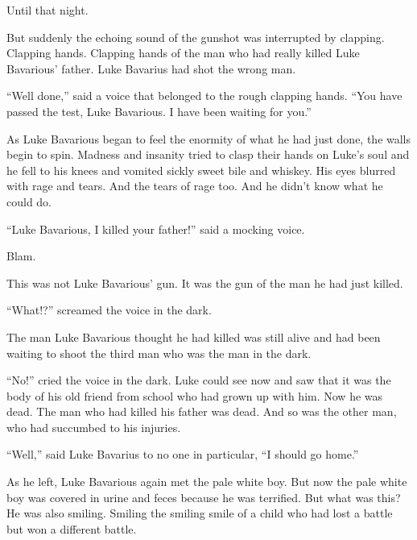 Until that night.



But suddenly the echoing sound of the gunshot was interrupted by
clapping. Clapping hands. Clapping hands of the man who had really
killed Luke Bavarious' father. Luke Bavarius had shot the
wrong man.



``Well done,'' said a voice that belonged to the rough
clapping hands. ``You have passed the test, Luke Bavarious. I
have been waiting for you.''



As Luke Bavarious began to feel the enormity of what he had just
done, the walls begin to spin. Madness and insanity tried to clasp
their hands on Luke's soul and he fell to his knees and
vomited sickly sweet bile and whiskey. His eyes blurred with rage
and tears. And the tears of rage too. And he didn't know what
he could do.



``Luke Bavarious, I killed your father!'' said a mocking
voice.



Blam.



This was not Luke Bavarious' gun. It was the gun of the man
he had just killed.



``What!?'' screamed the voice in the dark.



The man Luke Bavarious thought he had killed was still alive and
had been waiting to shoot the third man who was the man in the
dark.



``No!'' cried the voice in the dark. Luke could see now
and saw that it was the body of his old friend from school who had
grown up with him. Now he was dead. The man who had killed his
father was dead. And so was the other man, who had succumbed to his
injuries.



``Well,'' said Luke Bavarius to no one in particular,
``I should go home.''



As he left, Luke Bavarious again met the pale white boy. But now
the pale white boy was covered in urine and feces because he was
terrified. But what was this? He was also smiling. Smiling the
smiling smile of a child who had lost a battle but won a different
battle.



